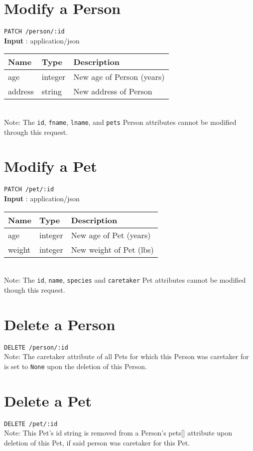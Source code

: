 \documentclass{article}
\begin{document}
\section*{Modify a Person}
\texttt{PATCH /person/:id} \\
\textbf{Input} : application/json \\
\begin{tabular}{| l | l | l |}
	\hline
	\textbf{Name} & \textbf{Type} & \textbf{Description} \\
	\hline
	age           & integer       & New age of Person (years) \\
	\hline
	address       & string        & New address of Person \\
	\hline
\end{tabular}
\\
Note: The \texttt{id}, \texttt{fname}, \texttt{lname}, and \texttt{pets}
Person attributes cannot be modified through this request.

\section*{Modify a Pet}
\texttt{PATCH /pet/:id} \\
\textbf{Input} : application/json \\
\begin{tabular}{| l | l | l |}
	\hline
	\textbf{Name} & \textbf{Type} & \textbf{Description} \\
	\hline
	age           & integer        & New age of Pet (years) \\
	\hline
	weight        & integer        & New weight of Pet (lbs) \\
	\hline
\end{tabular}
\\
Note: The \texttt{id}, \texttt{name}, \texttt{species} and \texttt{caretaker} 
Pet attributes cannot be modified though this request.

\section*{Delete a Person}
\texttt{DELETE /person/:id} \\
Note: The caretaker attribute of all Pets for which this Person was caretaker for
is set to \texttt{None} upon the deletion of this Person.

\section*{Delete a Pet}
\texttt{DELETE /pet/:id} \\
Note: This Pet's id string is removed from a Person's pets[] attribute upon
deletion of this Pet, if said person was caretaker for this Pet.
\end{document}
